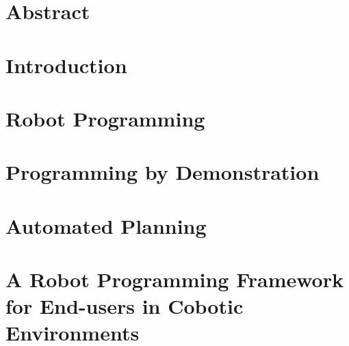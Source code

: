 \documentclass[a4paper,12pt,twoside,openany]{book}
\theoremstyle{definition}
\theoremstyle{remark}
\begin{document}

 \maketitle

%

\chapter*{Abstract}


\tableofcontents
\listoffigures


\chapter{Introduction} \label{chap:Intro}


\chapter{Robot Programming}\label{chap:Sota}

\chapter{Programming by Demonstration}\label{chap:Sota-PbD}


\chapter{Automated Planning}\label{chap:Sota-AP}


\chapter{A Robot Programming Framework for End-users in Cobotic Environments}\label{chap:Contribution}


%
\end{document}
